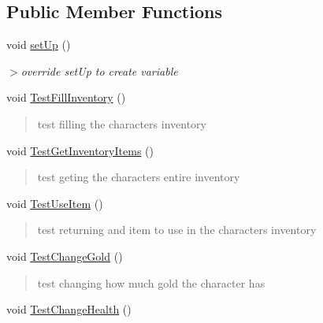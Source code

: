 \subsection*{Public Member Functions}
\begin{DoxyCompactItemize}
\item 
void \hyperlink{classCharacterTest_ace997a849bc464da6408580b20abbde5}{set\-Up} ()
\begin{DoxyCompactList}\small\item\em $>$override {\ttfamily set\-Up} to create variable \end{DoxyCompactList}\item 
void \hyperlink{classCharacterTest_a348e663ab1846bbe64770dfd437bea49}{Test\-Fill\-Inventory} ()
\begin{DoxyCompactList}\small\item\em \begin{quotation}
test filling the characters inventory \end{quotation}
\end{DoxyCompactList}\item 
void \hyperlink{classCharacterTest_a0fae073fe364d5bb09e1488505f2f247}{Test\-Get\-Inventory\-Items} ()
\begin{DoxyCompactList}\small\item\em \begin{quotation}
test geting the characters entire inventory \end{quotation}
\end{DoxyCompactList}\item 
void \hyperlink{classCharacterTest_a6510093a5bfccb8d325e00e0a15a81c2}{Test\-Use\-Item} ()
\begin{DoxyCompactList}\small\item\em \begin{quotation}
test returning and item to use in the characters inventory \end{quotation}
\end{DoxyCompactList}\item 
void \hyperlink{classCharacterTest_a318991be56057b2587fcf357e13409ab}{Test\-Change\-Gold} ()
\begin{DoxyCompactList}\small\item\em \begin{quotation}
test changing how much gold the character has \end{quotation}
\end{DoxyCompactList}\item 
void \hyperlink{classCharacterTest_a1e3ff758e3a47589ac31297cf62db9c4}{Test\-Change\-Health} ()

\end{DoxyCompactItemize}
